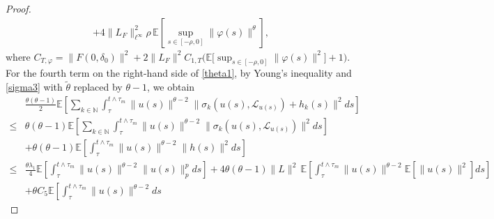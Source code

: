 \documentclass[11pt]{article}
\numberwithin{equation}{section}
\theoremstyle{plain}
\begin{document}
\begin{proof}
\begin{align}
 	+ 4 \|L_F\|_{\ell^\infty}^2 \rho \,
 	\mathbb{E}\left[
 	\sup_{s \in [-\rho,0]} \|\varphi(s)\|^{\theta}
 	\right], 
 \end{align}
 where 
 $C_{T,\varphi}
    = \|F(0,\delta_0)\|^2 
        + 2 \|L_{F}\|^2
            C_{1,T} 
                         \bigg( \mathbb{E} 
                                                      \Big[ \sup_{s \in [-\rho,0]} \|\varphi(s)\|^2 
                                                      \Big]
                                    + 1 
                         \bigg). 
 $ \\
 For the fourth term on the right-hand side of \eqref{theta1},
 by Young's inequality
 and
 \eqref{sigma3} with $\tilde{\theta}$ replaced by $\theta-1$,
 we obtain
 \begin{align}\label{moment_gjg1}
 	   & \frac{\theta(\theta-1)}{2}
 	            \mathbb{E} 
 	                   \left[ \sum_{k \in \mathbb{N}}
                             	      \int_{\tau}^{t \wedge \tau_m}
 	                                       \|u(s)\|^{\theta-2}
 	                                       \|\sigma_k(u(s), \mathcal{L}_{u(s)}) + h_k(s)\|^2 ds
 	                   \right]  \nonumber\\
 \le & \theta(\theta-1)
             	\mathbb{E}
             	       \left[ \sum_{k \in \mathbb{N}}
 	                                  \int_{\tau}^{t \wedge \tau_m}
 	                                      \|u(s)\|^{\theta-2}
 	                                      \|\sigma_k(u(s), \mathcal{L}_{u(s)})\|^2 ds
 	                  \right]  \nonumber\\
 	  & + \theta(\theta-1)
 	                 \mathbb{E} 
 	                       \left[ \int_{\tau}^{t \wedge \tau_m}
 	                                    \|u(s)\|^{\theta-2}
 	                                    \|h(s)\|^2 ds
 	                       \right]  \nonumber\\[1ex]
 \le & \frac{\theta \lambda_1}{4}
 	            \mathbb{E}
 	                   \left[ \int_{\tau}^{t \wedge \tau_m}
 	                                \|u(s)\|^{\theta-2} \|u(s)\|_p^{p} ds
                       \right] 
 	         + 4 \theta(\theta-1) \|L\|^2 \,
         	         \mathbb{E} 
 	                       \left[ \int_{\tau}^{t \wedge \tau_m}
 	                                    \|u(s)\|^{\theta-2}
 	                                    \mathbb{E} \left[ \|u(s)\|^2 \right] ds
 	                       \right]  \nonumber\\
 	  & + \theta C_5
 	                 \mathbb{E} 
            	          \left[ \int_{\tau}^{t \wedge \tau_m}	\|u(s)\|^{\theta-2} ds

\end{align}
\end{proof}
\end{document}
